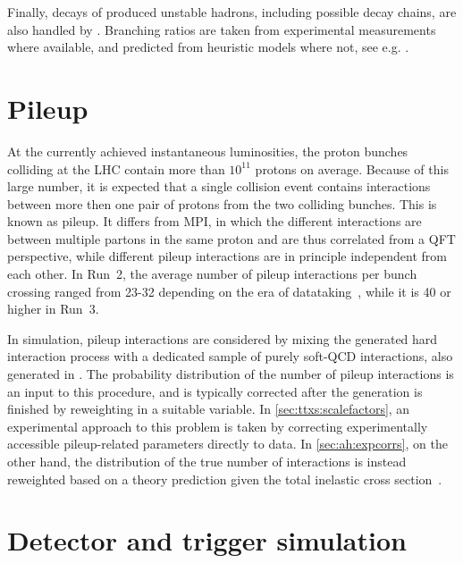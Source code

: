 Finally, decays of produced unstable hadrons, including possible decay chains, are also handled by \pythia. Branching ratios are taken from experimental measurements where available, and predicted from heuristic models where not, see e.g. .

\section{Pileup}
\label{sec:mc:pileup}

At the currently achieved instantaneous luminosities, the proton bunches colliding at the LHC contain more than $10^{11}$ protons on average. Because of this large number, it is expected that a single collision event contains interactions between more then one pair of protons from the two colliding bunches. This is known as pileup. It differs from MPI, in which the different interactions are between multiple partons in the same proton and are thus correlated from a QFT perspective, while different pileup interactions are in principle independent from each other. In Run~2, the average number of pileup interactions per bunch crossing ranged from 23-32 depending on the era of datataking~\cite{CMS:2020ebo}, while it is 40 or higher in Run~3.

In simulation, pileup interactions are considered by mixing the generated hard interaction process with a dedicated sample of purely soft-QCD interactions, also generated in \pythia. The probability distribution of the number of pileup interactions is an input to this procedure, and is typically corrected after the generation is finished by reweighting in a suitable variable. In \cref{sec:ttxs:scalefactors}, an experimental approach to this problem is taken by correcting experimentally accessible pileup-related parameters directly to data. In \cref{sec:ah:expcorrs}, on the other hand, the distribution of the true number of interactions is instead reweighted based on a theory prediction given the total inelastic cross section~\cite{CMS:LUM-17-003}.

\section{Detector and trigger simulation}
\label{sec:mc:detector}

